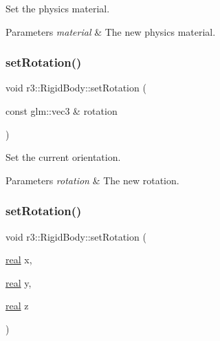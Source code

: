 Set the physics material. 


\begin{DoxyParams}{Parameters}
{\em material} & The new physics material. \\
\hline
\end{DoxyParams}
\mbox{\label{classr3_1_1_rigid_body_aeaad22c99a9254f38c93e8e622bb4c01}} 
\subsubsection{\texorpdfstring{set\+Rotation()}{setRotation()}\hspace{0.1cm}{\footnotesize\ttfamily [1/2]}}
{\footnotesize\ttfamily void r3\+::\+Rigid\+Body\+::set\+Rotation (\begin{DoxyParamCaption}\item[{const glm\+::vec3 \&}]{rotation }\end{DoxyParamCaption})}



Set the current orientation. 


\begin{DoxyParams}{Parameters}
{\em rotation} & The new rotation. \\
\hline
\end{DoxyParams}
\mbox{\label{classr3_1_1_rigid_body_a5ac826cea8762df5a5b5c6113d84ad2b}} 
\subsubsection{\texorpdfstring{set\+Rotation()}{setRotation()}\hspace{0.1cm}{\footnotesize\ttfamily [2/2]}}
{\footnotesize\ttfamily void r3\+::\+Rigid\+Body\+::set\+Rotation (\begin{DoxyParamCaption}\item[{\mbox{\hyperlink{namespacer3_ab2016b3e3f743fb735afce242f0dc1eb}{real}}}]{x,  }\item[{\mbox{\hyperlink{namespacer3_ab2016b3e3f743fb735afce242f0dc1eb}{real}}}]{y,  }\item[{\mbox{\hyperlink{namespacer3_ab2016b3e3f743fb735afce242f0dc1eb}{real}}}]{z }\end{DoxyParamCaption})}



